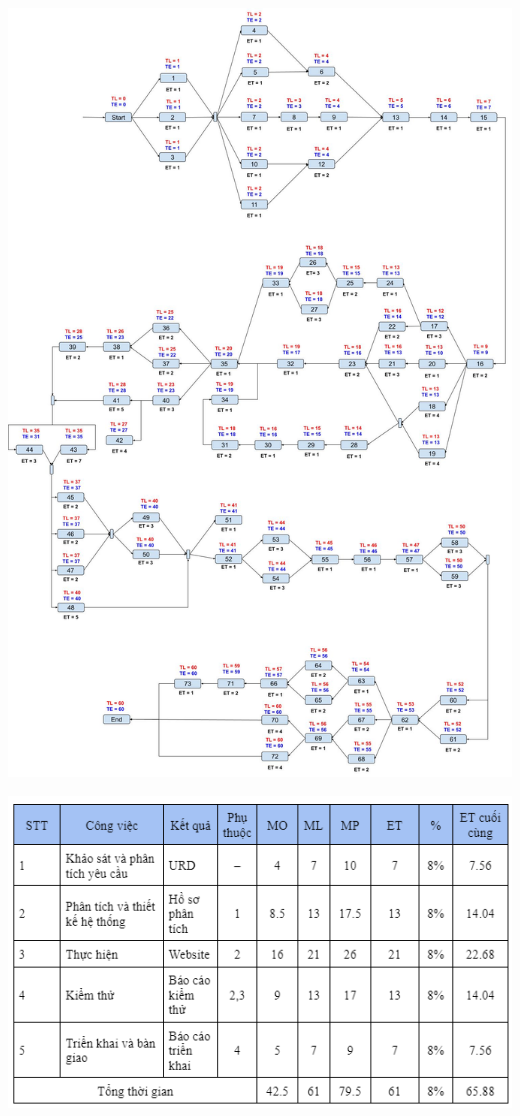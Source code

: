 \documentclass[12pt]{article}
\begin{document}
\hspace{-2cm}\includegraphics[width=17cm]{PERT2.jpg}
\par
\includegraphics[width=14.5cm]{PERT.png}
\vspace{0.5cm} 
\end{document}
